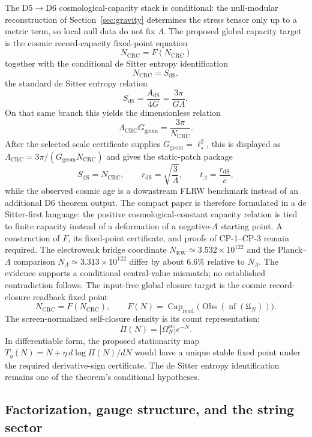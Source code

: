 \documentclass[11pt]{article}
\begin{document}
The D5\(\to\)D6 cosmological-capacity stack is conditional: the null-modular reconstruction of Section~\ref{sec:gravity} determines the stress tensor only up to a metric term, so local null data do not fix $\Lambda$. The proposed global capacity target is the cosmic record-capacity fixed-point equation
\[
N_{\mathrm{CRC}}=F(N_{\mathrm{CRC}})
\]
together with the conditional de Sitter entropy identification
\[
N_{\mathrm{CRC}}=S_{\mathrm{dS}},
\]
\noindent the standard de Sitter entropy relation
\[
S_{\mathrm{dS}}=\frac{A_{\mathrm{dS}}}{4G}=\frac{3\pi}{G\Lambda},
\]
On that same branch this yields the dimensionless relation
\[
\Lambda_{\mathrm{CRC}}G_{\mathrm{geom}}=\frac{3\pi}{N_{\mathrm{CRC}}}.
\]
After the selected scale certificate supplies \(G_{\mathrm{geom}}=\ell_\star^2\), this is displayed as
\(\Lambda_{\mathrm{CRC}}=3\pi/(G_{\mathrm{geom}}N_{\mathrm{CRC}})\) and gives the static-patch
package
\[
S_{\mathrm{dS}}=N_{\mathrm{CRC}},
\qquad
r_{\mathrm{dS}}=\sqrt{\frac{3}{\Lambda}},
\qquad
t_\Lambda=\frac{r_{\mathrm{dS}}}{c},
\]
while the observed cosmic age is a downstream FLRW benchmark instead of an additional D6 theorem output. The compact paper is therefore formulated in a de Sitter-first language: the positive cosmological-constant capacity relation is tied to finite capacity instead of a deformation of a negative-$\Lambda$ starting point. A construction of \(F\), its fixed-point certificate, and proofs of CP-1--CP-3 remain required. The electroweak bridge coordinate \(N_{\mathrm{EW}}\simeq3.532\times10^{122}\) and the Planck--\(\Lambda\) comparison \(N_{\Lambda}\simeq3.313\times10^{122}\) differ by about \(6.6\%\) relative to \(N_{\Lambda}\). The evidence supports a conditional central-value mismatch; no established contradiction follows.
The input-free global closure target is the cosmic record-closure readback fixed point
\[
N_{\mathrm{CRC}}=F(N_{\mathrm{CRC}}),
\qquad
F(N)=\operatorname{Cap}_{\mathrm{read}}
\bigl(\operatorname{Obs}(\operatorname{nf}(\mathfrak U_N))\bigr).
\]
The screen-normalized self-closure density is its count representation:
\[
\Pi(N)=|\Omega^{\mathrm{sc}}_N|e^{-N}.
\]
In differentiable form, the proposed stationarity map
\(T_\eta(N)=N+\eta\,d\log\Pi(N)/dN\) would have a unique stable fixed point under the required
derivative-sign certificate. The de Sitter entropy identification remains one of the theorem's
conditional hypotheses.

\subsection{Factorization, gauge structure, and the string sector}
\end{document}
